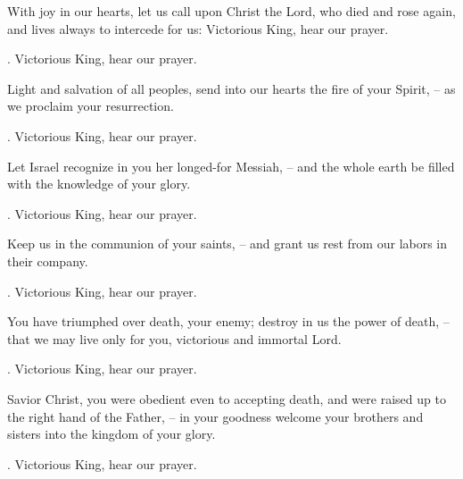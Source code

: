 \lettrine[lines=2]{W}{}ith joy in our hearts, let us call upon Christ the Lord, who died and rose again, and lives always to intercede for us: Victorious King, hear our prayer.
\par \Rbar. Victorious King, hear our prayer.

Light and salvation of all peoples, send into our hearts the fire of your Spirit,
– as we proclaim your resurrection.
\par \Rbar. Victorious King, hear our prayer.

Let Israel recognize in you her longed-for Messiah,
– and the whole earth be filled with the knowledge of your glory.
\par \Rbar. Victorious King, hear our prayer.

Keep us in the communion of your saints,
– and grant us rest from our labors in their company.
\par \Rbar. Victorious King, hear our prayer.

You have triumphed over death, your enemy; destroy in us the power of death,
– that we may live only for you, victorious and immortal Lord.
\par \Rbar. Victorious King, hear our prayer.

Savior Christ, you were obedient even to accepting death, and were raised up to the right hand of the Father,
– in your goodness welcome your brothers and sisters into the kingdom of your glory.
\par \Rbar. Victorious King, hear our prayer.